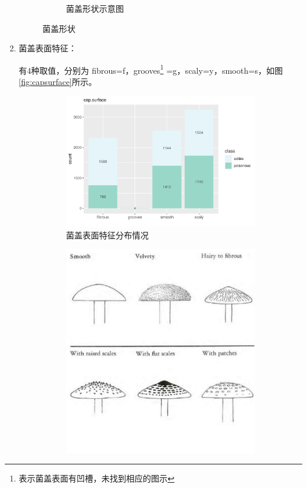 \documentclass[lang=cn,11pt,a4paper,cite=super]{elegantpaper}
\begin{document}
\begin{enumerate}
\begin{figure}[hbt]
\begin{subfigure}[b]{0.3\textwidth}
        \caption{菌盖形状示意图}
      \end{subfigure}
      \caption{菌盖形状}
      \label{fig:capshape}
   \end{figure}

   \item 菌盖表面特征：\par 有4种取值，分别为 fibrous=f，grooves\footnote{表示菌盖表面有凹槽，未找到相应的图示}
   =g，scaly=y，smooth=s，如图\ref{fig:capsurface}所示。
   \begin{figure}[htb]
      \begin{subfigure}[b]{0.69\textwidth}
        \centering
        \includegraphics[width=\linewidth]{img/capsurface-1.pdf}  
      \caption{菌盖表面特征分布情况}
      \end{subfigure}
      \begin{subfigure}[b]{0.3\textwidth}
        \centering
        \includegraphics[width=\linewidth]{img/capsurface.PNG}  

\end{subfigure}
\end{figure}
\end{enumerate}
\end{document}
